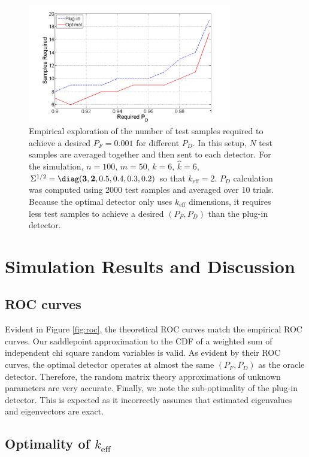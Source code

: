 \begin{figure}
\centering
\includegraphics[width=3.5in]{figures/samples_graph.png}
\caption{Empirical exploration of the number of test samples required to achieve a desired $P_F=0.001$ for different $P_D$. In this setup, $N$ test samples are averaged together and then sent to each detector. For the simulation, $n=100$, $m=50$, $k=6$, $\widehat{k}=6$,$\Sigma^{1/2} = \diag({\bf{3,2}},0.5,0.4,0.3,0.2)$ so that $k_{\text{eff}}=2$. $P_D$ calculation was computed using 2000 test samples and averaged over 10 trials. Because the optimal detector only uses $k_\text{eff}$ dimensions, it requires less test samples to achieve a desired $(P_F, P_D)$ than the plug-in detector.}
\label{fig:samples}
\end{figure}

\section{Simulation Results and Discussion}\label{sec:disc}

\subsection{ROC curves}

Evident in Figure \ref{fig:roc}, the theoretical ROC curves match the empirical ROC curves. Our saddlepoint approximation to the CDF of a weighted sum of independent chi square random variables is valid. As evident by their ROC curves, the optimal detector operates at almost the same $(P_F, P_D)$ as the oracle detector. Therefore, the random matrix theory approximations of unknown parameters are very accurate. Finally, we note the sub-optimality of the plug-in detector. This is expected as it incorrectly assumes that estimated eigenvalues and eigenvectors are exact.

\subsection{Optimality of $k_\text{eff}$}

